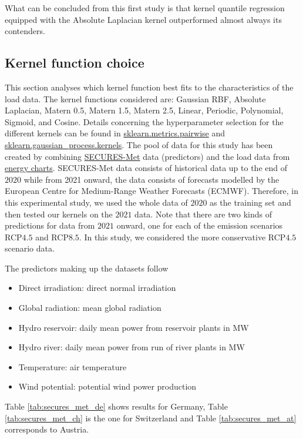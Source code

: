 What can be concluded from this first study is that kernel quantile regression equipped with the Absolute Laplacian kernel outperformed almost always its contenders.

\subsection{Kernel function choice}
This section analyses which kernel function best fits to the characteristics of the load data.
The kernel functions considered are: Gaussian RBF, Absolute Laplacian, Matern 0.5, Matern 1.5, Matern 2.5, Linear, Periodic, Polynomial, Sigmoid, and Cosine. 
Details concerning the hyperparameter selection for the different kernels can be found in \href{https://scikit-learn.org/stable/api/sklearn.metrics.html}{sklearn.metrics.pairwise} and \href{https://scikit-learn.org/stable/api/sklearn.gaussian_process.html}{sklearn.gaussian\_process.kernels}.
The pool of data for this study has been created by combining \href{https://zenodo.org/records/7907883}{SECURES-Met} data (predictors) \cite{Formayer2023} and the load data from \href{https://www.energy-charts.info/index.html?l=en&c=DE}{energy charts}.
SECURES-Met data consists of historical data up to the end of $2020$ while from 2021 onward, the data consists of forecasts modelled by the European Centre for Medium-Range Weather Forecasts (ECMWF).
Therefore, in this experimental study, we used the whole data of $2020$ as the training set and then tested our kernels on the $2021$ data.
Note that there are two kinds of predictions for data from $2021$ onward, one for each of the emission scenarios RCP$4.5$ and RCP$8.5$. In this study, we considered the more conservative RCP$4.5$ scenario data.

The predictors making up the datasets follow
\begin{itemize}
    \item Direct irradiation: direct normal irradiation
    \item Global radiation: mean global radiation
    \item Hydro reservoir: daily mean power from reservoir plants in MW
    \item Hydro river: daily mean power from run of river plants in MW
    \item Temperature: air temperature
    \item Wind potential: potential wind power production
\end{itemize}
Table \ref{tab:secures_met_de} shows results for Germany, Table \ref{tab:secures_met_ch} is the one for Switzerland and Table \ref{tab:secures_met_at} corresponds to Austria.


